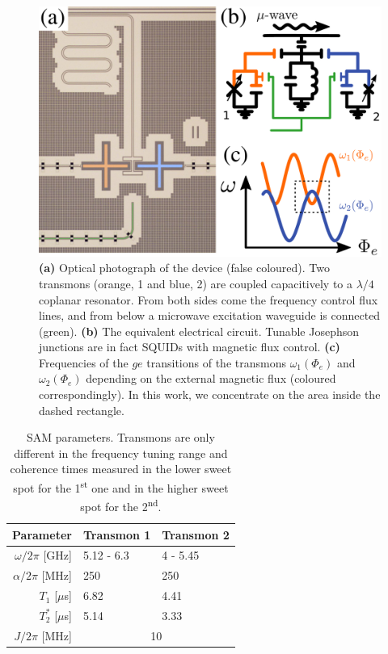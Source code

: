 \documentclass[%
 aip,
 amsmath,amssymb,
 reprint,%
]{revtex4-1}
\begin{document}
\begin{figure}
	\includegraphics[width=\linewidth]{experiment}
	\caption{\textbf{(a)} Optical photograph of the device (false coloured). Two transmons (orange, 1 and blue, 2) are coupled capacitively to a $\lambda/4$ coplanar resonator. From both sides come the frequency control flux lines, and from below a microwave excitation waveguide is connected (green). \textbf{(b)} The equivalent electrical circuit. Tunable Josephson junctions are in fact SQUIDs with magnetic flux control. \textbf{(c)} Frequencies of the $ge$ transitions of the transmons $\omega_1(\Phi_e)$ and $\omega_2(\Phi_e)$ depending on the external magnetic flux (coloured correspondingly). In this work, we concentrate on the area inside the dashed rectangle.}
	\label{fig:experiment}
\end{figure}


\begin{table}
	\begin{ruledtabular}
	\begin{tabular}{rll}
	Parameter & Transmon 1  & Transmon 2\\\hline
	$\omega/2\pi$ [GHz] & 5.12 - 6.3  & 4 - 5.45\\
	$\alpha/2\pi$ [MHz] & 250 & 250 \\
	$T_1$ [$\mu$s]  & 6.82 &  4.41 \\
	$T_2^*$ [$\mu$s]  & 5.14  &  3.33\\\hline
	$J/2\pi$ [MHz] &\multicolumn{2}{c}{10} 
	\end{tabular}
	\end{ruledtabular}
	\caption{SAM parameters. Transmons are only different in the frequency tuning range and coherence times measured in the lower sweet spot for the 1\textsuperscript{st} one and in the higher sweet spot for the 2\textsuperscript{nd}.}
\end{table}
\end{document}
